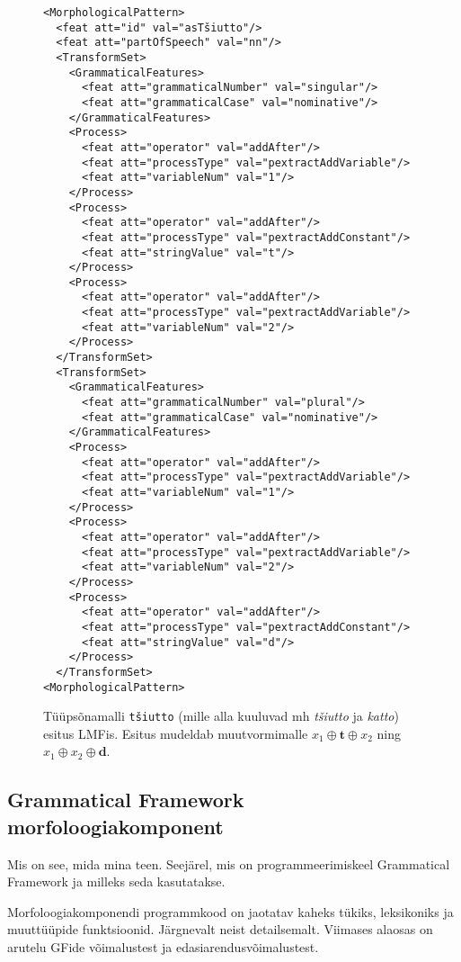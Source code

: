 \documentclass[12pt,a4paper]{article}
\begin{document}
\begin{figure}[p]
  \center
\begin{verbatim}
<MorphologicalPattern>
  <feat att="id" val="asTšiutto"/>
  <feat att="partOfSpeech" val="nn"/>
  <TransformSet>
    <GrammaticalFeatures>
      <feat att="grammaticalNumber" val="singular"/>
      <feat att="grammaticalCase" val="nominative"/>
    </GrammaticalFeatures>
    <Process>
      <feat att="operator" val="addAfter"/>
      <feat att="processType" val="pextractAddVariable"/>
      <feat att="variableNum" val="1"/>
    </Process>
    <Process>
      <feat att="operator" val="addAfter"/>
      <feat att="processType" val="pextractAddConstant"/>
      <feat att="stringValue" val="t"/>
    </Process>
    <Process>
      <feat att="operator" val="addAfter"/>
      <feat att="processType" val="pextractAddVariable"/>
      <feat att="variableNum" val="2"/>
    </Process>
  </TransformSet>
  <TransformSet>
    <GrammaticalFeatures>
      <feat att="grammaticalNumber" val="plural"/>
      <feat att="grammaticalCase" val="nominative"/>
    </GrammaticalFeatures>
    <Process>
      <feat att="operator" val="addAfter"/>
      <feat att="processType" val="pextractAddVariable"/>
      <feat att="variableNum" val="1"/>
    </Process>
    <Process>
      <feat att="operator" val="addAfter"/>
      <feat att="processType" val="pextractAddVariable"/>
      <feat att="variableNum" val="2"/>
    </Process>
    <Process>
      <feat att="operator" val="addAfter"/>
      <feat att="processType" val="pextractAddConstant"/>
      <feat att="stringValue" val="d"/>
    </Process>
  </TransformSet>
<MorphologicalPattern>
\end{verbatim}
\caption{Tüüpsõnamalli \texttt{tšiutto} (mille alla kuuluvad mh \textit{tšiutto} ja \textit{katto}) esitus LMFis. Esitus mudeldab muutvormimalle $x_1 \oplus \textbf{t} \oplus x_2$ ning $x_1 \oplus x_2 \oplus \textbf{d}$.
  \label{code:lmf-paradigmpattern}}
\end{figure}




\subsection{Grammatical Framework morfoloogiakomponent}

Mis on see, mida mina teen. Seejärel, mis on programmeerimiskeel Grammatical Framework ja milleks seda kasutatakse.

Morfoloogiakomponendi programmkood on jaotatav kaheks tükiks, leksikoniks ja muuttüüpide funktsioonid. Järgnevalt neist detailsemalt. Viimases alaosas on arutelu GFide võimalustest ja edasiarendusvõimalustest.
\end{document}
